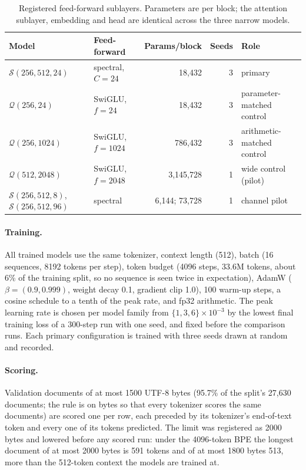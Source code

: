 \begin{table}[ht]
\centering\small
\caption{Registered feed-forward sublayers. Parameters are per block; the
attention sublayer, embedding and head are identical across the three
narrow models.}
\label{tab:configs}
\begin{tabular}{llrrl}
\toprule
Model & Feed-forward & Params/block & Seeds & Role \\
\midrule
$\mathcal{S}(256,512,24)$ & spectral, $C=24$ & 18{,}432 & 3 & primary \\
$\mathcal{Q}(256,24)$ & SwiGLU, $f=24$ & 18{,}432 & 3 & parameter-matched control \\
$\mathcal{Q}(256,1024)$ & SwiGLU, $f=1024$ & 786{,}432 & 3 & arithmetic-matched control \\
$\mathcal{Q}(512,2048)$ & SwiGLU, $f=2048$ & 3{,}145{,}728 & 1 & wide control (pilot) \\
$\mathcal{S}(256,512,8)$, $\mathcal{S}(256,512,96)$ & spectral & 6{,}144; 73{,}728 & 1 & channel pilot \\
\bottomrule
\end{tabular}
\end{table}

\paragraph{Training.} All trained models use the same tokenizer, context
length (512), batch (16 sequences, 8192 tokens per step), token budget (4096
steps, 33.6M tokens, about 6\% of the training split, so no sequence is seen
twice in expectation), AdamW ($\beta=(0.9,0.999)$, weight decay 0.1, gradient
clip 1.0), 100 warm-up steps, a cosine schedule to a tenth of the peak rate,
and fp32 arithmetic. The peak learning rate is chosen per model family from
$\{1, 3, 6\}\times10^{-3}$ by the lowest final training loss of a 300-step run
with one seed, and fixed before the comparison runs. Each primary
configuration is trained with three seeds drawn at random and recorded.

\paragraph{Scoring.} Validation documents of at most 1500 UTF-8 bytes (95.7\%
of the split's 27{,}630 documents; the rule is on bytes so that every
tokenizer scores the same documents) are scored one per row, each preceded by
its tokenizer's end-of-text token and every one of its tokens predicted. The
limit was registered as 2000 bytes and lowered before any scored run: under
the 4096-token BPE the longest document of at most 2000 bytes is 591 tokens
and of at most 1800 bytes 513, more than the 512-token context the models
are trained at.


